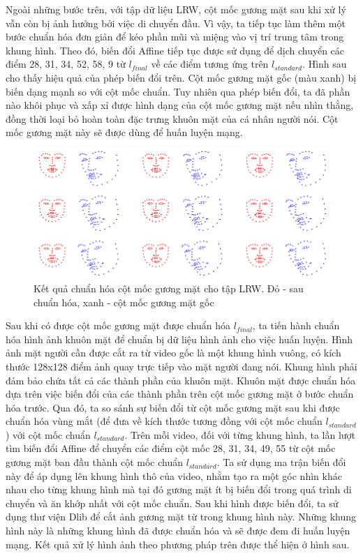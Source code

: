 Ngoài những bước trên, với tập dữ liệu LRW, cột mốc gương mặt sau khi xử lý vẫn còn bị ảnh hưởng bởi việc di chuyển đầu. Vì vậy, ta tiếp tục làm thêm một bước chuẩn hóa đơn giản để kéo phần mũi và miệng vào vị trí trung tâm trong khung hình. Theo đó, biến đổi Affine tiếp tục được sử dụng để dịch chuyển các điểm 28, 31, 34, 52, 58, 9 từ $l_{final}$ về các điểm tương ứng trên $l_{standard}$. Hình sau cho thấy hiệu quả của phép biến đổi trên. Cột mốc gương mặt gốc (màu xanh) bị biến dạng mạnh so với cột mốc chuẩn. Tuy nhiên qua phép biến đổi, ta đã phần nào khôi phục và xấp xỉ được hình dạng của cột mốc gương mặt nếu nhìn thằng, đồng thời loại bỏ hoàn toàn đặc trưng khuôn mặt của cá nhân người nói. Cột mốc gương mặt này sẽ được dùng để huấn luyện mạng.

\begin{figure}[H]
    \centering
    \includegraphics[width=15cm]{./content/materials/standardize_landmark.png}
    \caption{Kết quả chuẩn hóa cột mốc gương mặt cho tập LRW. Đỏ - sau chuẩn hóa, xanh - cột mốc gương mặt gốc}
\end{figure}

Sau khi có được cột mốc gương mặt được chuẩn hóa $l_{final}$, ta tiến hành chuẩn hóa hình ảnh khuôn mặt để chuẩn bị dữ liệu hình ảnh cho việc huấn luyện. Hình ảnh mặt người cần được cắt ra từ video gốc là một khung hình vuông, có kích thước 128x128 điểm ảnh quay trực tiếp vào mặt người đang nói. Khung hình phải đảm bảo chứa tất cả các thành phần của khuôn mặt. Khuôn mặt được chuẩn hóa dựa trên việc biến đổi của các thành phần trên cột mốc gương mặt ở bước chuẩn hóa trước. Qua đó, ta so sánh sự biến đổi từ cột mốc gương mặt sau khi được chuẩn hóa vùng mắt (để đưa về kích thước tương đồng với cột mốc chuẩn $l_{standard}$) với cột mốc chuẩn $l_{standard}$. Trên mỗi video, đối với từng khung hình, ta lần lượt tìm biến đổi Affine để chuyển các điểm cột mốc 28, 31, 34, 49, 55 từ cột mốc gương mặt ban đầu thành cột mốc chuẩn $l_{standard}$. Ta sử dụng ma trận biến đổi này để áp dụng lên khung hình thô của video, nhằm tạo ra một góc nhìn khác nhau cho từng khung hình mà tại đó gương mặt ít bị biến đổi trong quá trình di chuyển và ăn khớp nhất với cột mốc chuẩn. Sau khi hình được biến đổi, ta sử dụng thư viện Dlib để cắt ảnh gương mặt từ trong khung hình này. Những khung hình này là những khung hình đã được chuẩn hóa và sẽ được đem đi huấn luyện mạng. Kết quả xử lý hình ảnh theo phương pháp trên được thể hiện ở hình sau.

